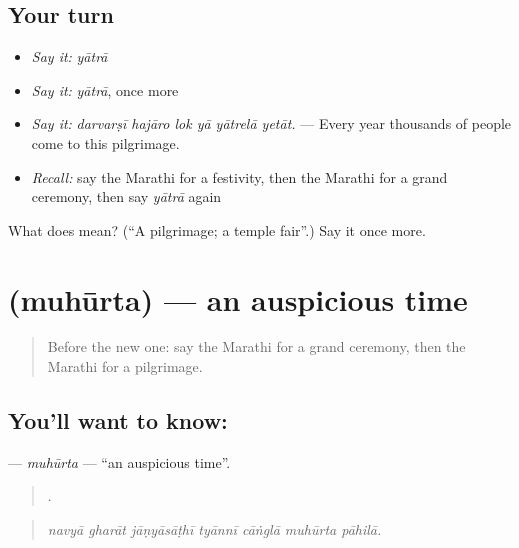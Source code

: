 \subsection*{Your turn}
\begin{itemize}
\raggedright
  \item \emph{Say it:} \emph{yātrā}
  \item \emph{Say it:} \emph{yātrā}, once more
  \item \emph{Say it:} \emph{darvarṣī hajāro lok yā yātrelā yetāt.} — Every year thousands of people come to this pilgrimage.
  \item \emph{Recall:} say the Marathi for a festivity, then the Marathi for a grand ceremony, then say \emph{yātrā} again
\end{itemize}

\begin{tcolorbox}[breakable,colback=teal!4,colframe=teal!35!black,title={Before you move on}]
What does  mean? (\textquotedblleft{}A pilgrimage; a temple fair\textquotedblright{}.) Say it once more.
\end{tcolorbox}
\section[\texorpdfstring{\mr{मुहूर्त} (muhūrta)}{मुहूर्त (muhūrta)}]{ (muhūrta) — an auspicious time}

\label{lesson:MR-C320-muhurta}



\begin{quote}
Before the new one: say the Marathi for a grand ceremony, then the Marathi for a pilgrimage.
\end{quote}

\subsection*{You'll want to know: }
\textbf{} — \emph{muhūrta} — \textquotedblleft{}an auspicious time\textquotedblright{}.

\begin{quote}
      .
\end{quote}

\begin{quote}
\emph{navyā gharāt jāṇyāsāṭhī tyānnī cāṅglā muhūrta pāhilā.}
\end{quote}

